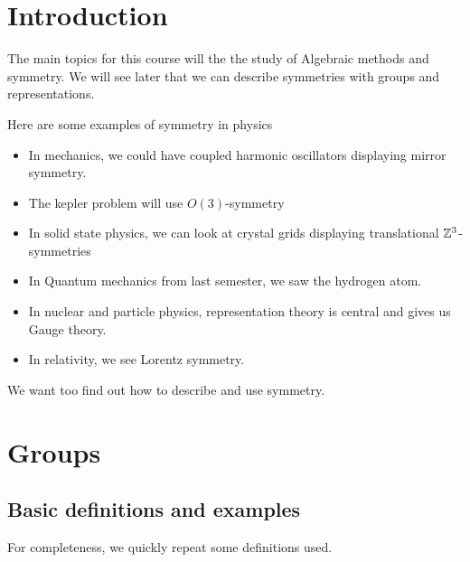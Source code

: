 \section*{Introduction}
The main topics for this course will the the study of Algebraic methods and symmetry. 
We will see later that we can describe symmetries with groups and representations.

Here are some examples of symmetry in physics
\begin{itemize}
  \item In mechanics, we could have coupled harmonic oscillators displaying mirror symmetry.
  \item The kepler problem will use $O(3)$-symmetry
  \item In solid state physics, we can look at crystal grids displaying translational $\mathbb{Z}^3$-symmetries
  \item In Quantum mechanics from last semester, we saw the hydrogen atom.
  \item In nuclear and particle physics, representation theory is central and gives us Gauge theory.
  \item In relativity, we see Lorentz symmetry.
\end{itemize}
We want too find out how to describe and use symmetry.

\section{Groups}

\subsection{Basic definitions and examples}
For completeness, we quickly repeat some definitions used.

